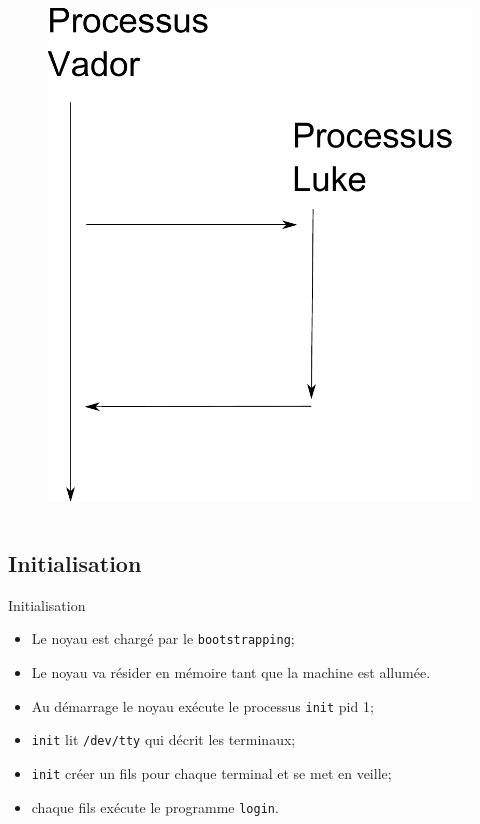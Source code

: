 \begin{frame}{\sectitle}
\begin{columns}[b]
\begin{figure}
\includegraphics[width=\textwidth]{images/PereFils.pdf}
\end{figure}

\end{columns}

\end{frame}


\begin{frame}{\sectitle}
\def\subsectitle{Initialisation}
\subsection{\subsectitle}

\begin{block}{\subsectitle}
\begin{itemize}
    \item Le noyau est chargé par le \texttt{bootstrapping};
    \item Le noyau va résider en mémoire tant que la machine est allumée.
    \item Au démarrage le noyau exécute le processus \texttt{init} pid 1;
    \item \texttt{init} lit \texttt{/dev/tty} qui décrit les terminaux;
    \item \texttt{init} créer un fils pour chaque terminal et se met en veille;
    \item chaque fils exécute le programme \texttt{login}.
\end{itemize}
\end{block}
\end{frame}


